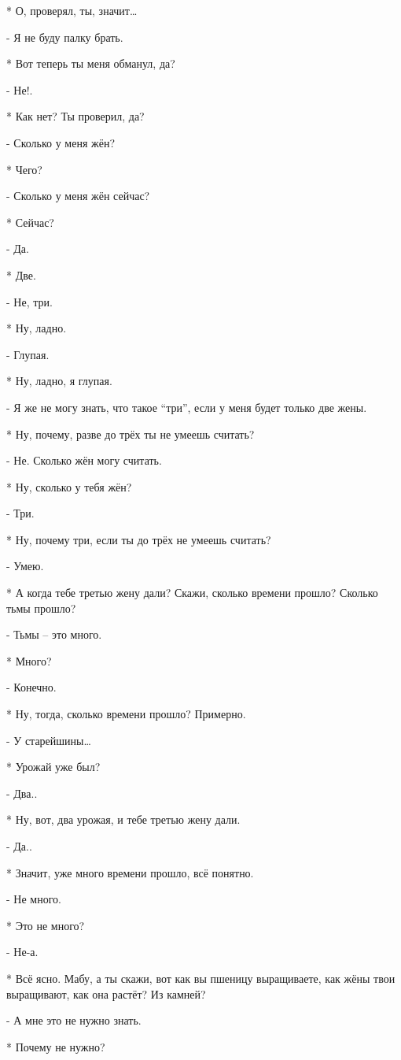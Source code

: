 * О, проверял, ты, значит…

- Я не буду палку брать.

* Вот теперь ты меня обманул, да?

- Не!.

* Как нет? Ты проверил, да?

- Сколько у меня жён?

* Чего?

- Сколько у меня жён сейчас?

* Сейчас?

- Да.

* Две.

- Не, три.

* Ну, ладно.

- Глупая.

* Ну, ладно, я глупая.

- Я же не могу знать, что такое “три”, если у меня будет только две жены.

* Ну, почему, разве до трёх ты не умеешь считать?

- Не. Сколько жён могу считать.

* Ну, сколько у тебя жён?

- Три.

* Ну, почему три, если ты до трёх не умеешь считать?

- Умею.

* А когда тебе третью жену дали? Скажи, сколько времени прошло? Сколько тьмы прошло?

- Тьмы – это много.

* Много?

- Конечно.

* Ну, тогда, сколько времени прошло? Примерно. 

- У старейшины…

* Урожай уже был?

- Два..

* Ну, вот, два урожая, и тебе третью жену дали.

- Да..

* Значит, уже много времени прошло, всё понятно.

- Не много.

* Это не много?

- Не-а.

* Всё ясно. Мабу, а ты скажи, вот как вы пшеницу выращиваете, как жёны твои выращивают, как она растёт? Из камней?

- А мне это не нужно знать.

* Почему не нужно?


